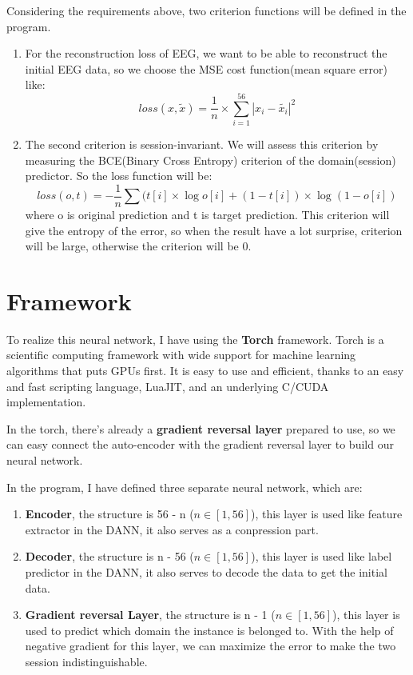 Considering the requirements above, two criterion functions will be defined in the program. 

\begin{enumerate}
	\item For the reconstruction loss of EEG, we want to be able to reconstruct the initial EEG data, so we choose the MSE cost function(mean square error) like:
	\[ loss(x, \tilde{x}) = \frac{1}{n} \times \sum_{i=1}^{56}| x_{i}-\tilde{x_{i}}|^2 \]

	\item The second criterion is session-invariant. We will assess this criterion by measuring the BCE(Binary Cross Entropy) criterion of the domain(session) predictor. So the loss function will be:
	\[ loss(o, t) = -\frac{1}{n} \sum(t[i]\times \log o[i]  +  (1-t[i])\times\log (1-o[i]) \]
	where o is original prediction and t is target prediction. This criterion will give the entropy of the error, so when the result have a lot surprise, criterion will be large, otherwise the criterion will be 0.
\end{enumerate}

\section{Framework}
To realize this neural network, I have using the \textbf{Torch} framework. Torch is a scientific computing framework with wide support for machine learning algorithms that puts GPUs first. It is easy to use and efficient, thanks to an easy and fast scripting language, LuaJIT, and an underlying C/CUDA implementation.

In the torch, there's already a \textbf{gradient reversal layer} prepared to use, so we can easy connect the auto-encoder with the gradient reversal layer to build our neural network.

In the program, I have defined three separate neural network, which are:
\begin{enumerate}
	\item \textbf{Encoder}, the structure is 56 - n ($ n \in [1,56] $), this layer is used like feature extractor in the DANN, it also serves as a conpression part.
	\item \textbf{Decoder}, the structure is n - 56 ($ n \in [1,56] $), this layer is used like label predictor in the DANN, it also serves to decode the data to get the initial data.
	\item \textbf{Gradient reversal Layer}, the structure is n - 1 ($ n \in [1,56] $), this layer is used to predict which domain the instance is belonged to. With the help of negative gradient for this layer, we can maximize the error to make the two session indistinguishable. 
\end{enumerate}

